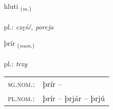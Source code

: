 \documentclass[frontgrid, backgrid]{flacards}\usepackage[]{graphicx}\usepackage[]{xcolor}
\begin{document}
\renewcommand{\flhead}{\vskip5pt \fboxsep=0pt {\small\bfseries\footnotesize Nafnorð | Noun}}
\renewcommand{\fcfoot}{\vskip5pt \fboxsep=0pt \hspace{2pt}{\small\bfseries\footnotesize 1K}}

\renewcommand{\blhead}{\vskip5pt {\small\bfseries\footnotesize Nafnorð | Noun }}
\renewcommand{\bcfoot}{\vskip5pt \hspace{2pt}{\small\bfseries\footnotesize 1K}}


{hluti \small{\textsubscript{(\textit{m.})}} \\[1ex] %
\textphonetic{[l̥ʏːtɪ]} \\
pl.: \emph{część, porcja} \\  [2ex]
\renewcommand*{\arraystretch}{0.8}
}

\renewcommand{\flhead}{\vskip5pt \fboxsep=0pt {\small\bfseries\footnotesize Töluorð | Numeral}}
\renewcommand{\fcfoot}{\vskip5pt \fboxsep=0pt \hspace{2pt}{\small\bfseries\footnotesize 1K}}

\renewcommand{\blhead}{\vskip5pt {\small\bfseries\footnotesize Töluorð | Numeral }}
\renewcommand{\bcfoot}{\vskip5pt \hspace{2pt}{\small\bfseries\footnotesize 1K}}


{þrír \small{\textsubscript{(\textit{num.})}} \\[1ex] %
\textphonetic{[θriːr]} \\
pl.: \emph{trzy} \\  [2ex]
\renewcommand*{\arraystretch}{0.8}
\begin{tabular}{ll}
\textsc{sg.nom.}: & þrír  -- \\ 
\textsc{pl.nom.}: & þrír -- þrjár -- þrjú
\end{tabular}
}
\end{document}
